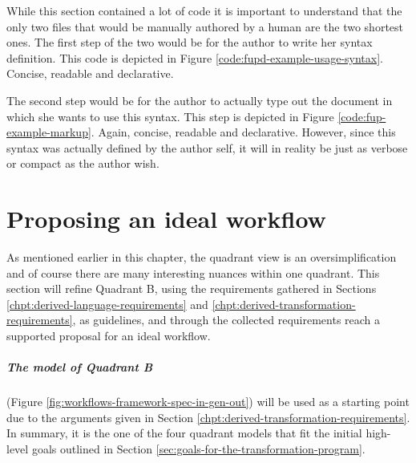 \documentclass{scrreprt}
\begin{document}
While this section contained a lot of code it is important to understand that the only two files that would be manually authored by a human are the two shortest ones. The first step of the two would be for the author to write her syntax definition. This code is depicted in Figure \ref{code:fupd-example-usage-syntax}. Concise, readable and declarative.

The second step would be for the author to actually type out the document in which she wants to use this syntax. This step is depicted in Figure \ref{code:fup-example-markup}. Again, concise, readable and declarative. However, since this syntax was actually defined by the author self, it will in reality be just as verbose or compact as the author wish.














%
%
%
%
%
%




\chapter{Proposing an ideal workflow}
\label{chpt:proposal-transformation-workflow}
As mentioned earlier in this chapter, the quadrant view is an oversimplification and of course there are many interesting nuances within one quadrant. This section will refine Quadrant B, using the requirements gathered in Sections \ref{chpt:derived-language-requirements} and \ref{chpt:derived-transformation-requirements}, as guidelines, and through the collected requirements reach a supported proposal for an ideal workflow.

\paragraph{The model of Quadrant B} (Figure \ref{fig:workflows-framework-spec-in-gen-out}) will be used as a starting point due to the arguments given in Section \ref{chpt:derived-transformation-requirements}. In summary, it is the one of the four quadrant models that fit the initial high-level goals outlined in Section \ref{sec:goals-for-the-transformation-program}.
\end{document}
